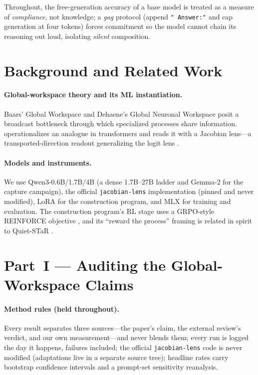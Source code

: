 \documentclass[11pt]{article}
\begin{document}
Throughout, the free-generation accuracy of a base model is treated as a measure
of \emph{compliance}, not knowledge; a \emph{gag} protocol (append
\texttt{"~Answer:"} and cap generation at four tokens) forces commitment so the
model cannot chain its reasoning out loud, isolating \emph{silent} composition.

\section{Background and Related Work}

\paragraph{Global-workspace theory and its ML instantiation.}
Baars' Global Workspace \cite{baars} and Dehaene's Global Neuronal Workspace
\cite{dehaene} posit a broadcast bottleneck through which specialized processes
share information. \cite{anthropic-workspace} operationalizes an analogue in
transformers and reads it with a Jacobian lens---a transported-direction readout
generalizing the logit lens \cite{logit-lens}.

\paragraph{Models and instruments.}
We use Qwen3-0.6B/1.7B/4B \cite{qwen3} (a dense 1.7B--27B ladder and Gemma-2 for
the capture campaign), the official \texttt{jacobian-lens} implementation (pinned
and never modified), LoRA \cite{lora} for the construction program, and MLX
\cite{mlx} for training and evaluation. The construction program's RL stage uses
a GRPO-style REINFORCE objective \cite{grpo}, and its ``reward the process''
framing is related in spirit to Quiet-STaR \cite{quiet-star}.

\section{Part~I --- Auditing the Global-Workspace Claims}

\paragraph{Method rules (held throughout).}
Every result separates three sources---the paper's claim, the external review's
verdict, and our own measurement---and never blends them; every run is logged the
day it happens, failures included; the official \texttt{jacobian-lens} code is
never modified (adaptations live in a separate source tree); headline rates carry
bootstrap confidence intervals and a prompt-set sensitivity reanalysis.
\end{document}
